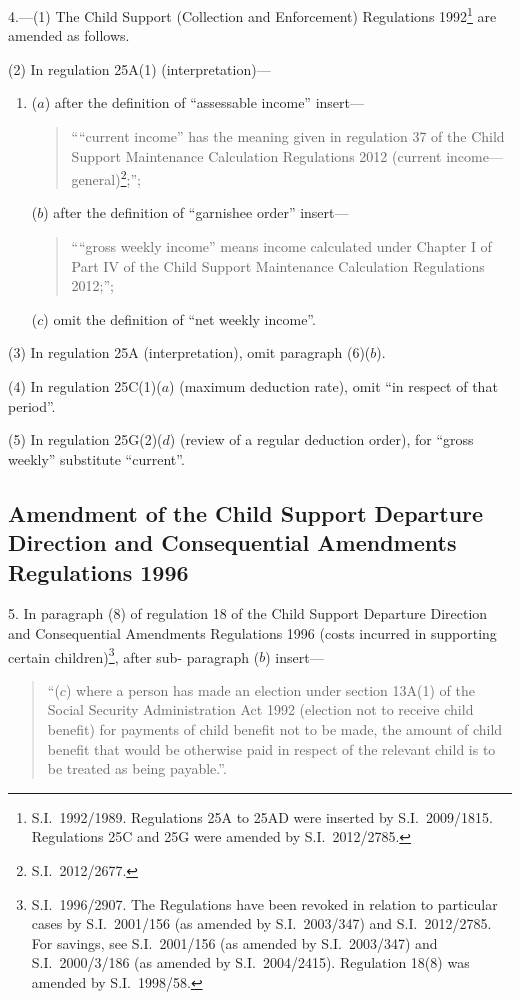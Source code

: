 \documentclass[12pt,a4paper]{article}
\begin{document}
4.---(1)  The Child Support (Collection and Enforcement) Regulations 1992\footnote{S.I.~1992/1989. Regulations 25A to 25AD were inserted by S.I.~2009/1815. Regulations 25C and 25G were amended by S.I.~2012/2785.} are amended as follows.

(2) In regulation 25A(1) (interpretation)—
\begin{enumerate}\item[]
($a$) after the definition of “assessable income” insert—
\begin{quotation}
““current income” has the meaning given in regulation 37 of the Child Support Maintenance Calculation Regulations 2012 (current income---general)\footnote{S.I.~2012/2677.};”;
\end{quotation}

($b$) after the definition of “garnishee order” insert—
\begin{quotation}
““gross weekly income” means income calculated under Chapter I of Part IV of the Child Support Maintenance Calculation Regulations 2012;”;
\end{quotation}

($c$) omit the definition of “net weekly income”.
\end{enumerate}

(3) In regulation 25A (interpretation), omit paragraph (6)($b$).

(4) In regulation 25C(1)($a$)  (maximum deduction rate), omit “in respect of that period”.

(5) In regulation 25G(2)($d$)  (review of a regular deduction order), for “gross weekly” substitute “current”.

\subsection[5. Amendment of the Child Support Departure Direction and Consequential Amendments Regulations 1996]{Amendment of the Child Support Departure Direction and Consequential Amendments Regulations 1996}

5.  In paragraph (8) of regulation 18 of the Child Support Departure Direction and Consequential Amendments Regulations 1996 (costs incurred in supporting certain children)\footnote{S.I.~1996/2907. The Regulations have been revoked in relation to particular cases by S.I.~2001/156 (as amended by S.I.~2003/347) and S.I.~2012/2785. For savings, see S.I.~2001/156 (as amended by S.I.~2003/347) and S.I.~2000/3/186 (as amended by S.I.~2004/2415). Regulation 18(8) was amended by S.I.~1998/58.}, after sub- paragraph ($b$)  insert—
\begin{quotation}
“($c$) where a person has made an election under section 13A(1) of the Social Security Administration Act 1992 (election not to receive child benefit) for payments of child benefit not to be made, the amount of child benefit that would be otherwise paid in respect of the relevant child is to be treated as being payable.”.
\end{quotation}
\end{document}
